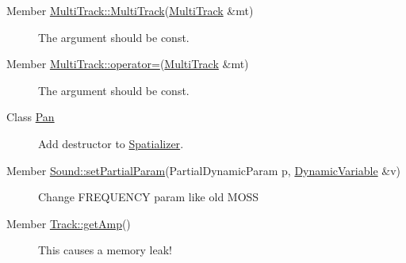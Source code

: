 \label{_todo000008}
\hypertarget{todo__todo000008}{}
 \begin{description}
\item[Member \hyperlink{classMultiTrack_a2}{Multi\-Track::Multi\-Track}(\hyperlink{classMultiTrack}{Multi\-Track} \&mt) ]The argument should be const.\end{description}


\label{_todo000009}
\hypertarget{todo__todo000009}{}
 \begin{description}
\item[Member \hyperlink{classMultiTrack_a3}{Multi\-Track::operator=}(\hyperlink{classMultiTrack}{Multi\-Track} \&mt) ]The argument should be const.\end{description}


\label{_todo000001}
\hypertarget{todo__todo000001}{}
 \begin{description}
\item[Class \hyperlink{classPan}{Pan} ]Add destructor to \hyperlink{classSpatializer}{Spatializer}.\end{description}


\label{_todo000010}
\hypertarget{todo__todo000010}{}
 \begin{description}
\item[Member \hyperlink{classSound_a3}{Sound::set\-Partial\-Param}(Partial\-Dynamic\-Param p, \hyperlink{classDynamicVariable}{Dynamic\-Variable} \&v) ]Change FREQUENCY param like old MOSS \end{description}


\label{_todo000011}
\hypertarget{todo__todo000011}{}
 \begin{description}
\item[Member \hyperlink{classTrack_a7}{Track::get\-Amp}() ]This causes a memory leak! \end{description}
